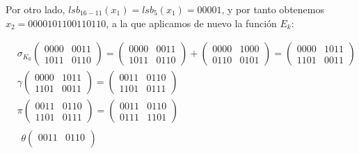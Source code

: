 \documentclass[fleqn]{article}
\begin{document}
    Por otro lado, $lsb_{16-11}(x_1) = lsb_5(x_1) = 00001$, y por tanto obtenemos $x_2 = 0000101100110110$, a la que aplicamos de nuevo 
    la función $E_k$:

    \begin{equation*}
        \begin{aligned}
            &\sigma_{K_0}
            \begin{pmatrix}
                0000 & 0011 \\
                1011 & 0110
            \end{pmatrix} = 
            \begin{pmatrix}
                0000 & 0011 \\
                1011 & 0110
            \end{pmatrix} + 
            \begin{pmatrix}
                0000 & 1000 \\
                0110 & 0101
            \end{pmatrix} = 
            \begin{pmatrix}
                0000 & 1011 \\
                1101 & 0011
            \end{pmatrix} \\
            &\gamma \begin{pmatrix}
                0000 & 1011 \\
                1101 & 0011
            \end{pmatrix} =
            \begin{pmatrix}
                0011 & 0110 \\
                1101 & 0111
            \end{pmatrix} \\
            &\pi \begin{pmatrix}
                0011 & 0110 \\
                1101 & 0111
            \end{pmatrix} =
            \begin{pmatrix}
                0011 & 0110 \\
                0111 & 1101
            \end{pmatrix} \\
            &\begin{aligned} 
                \theta 
                \begin{pmatrix}
                    0011 & 0110 \\

\end{pmatrix}
\end{aligned}
\end{aligned}
\end{equation*}
\end{document}

